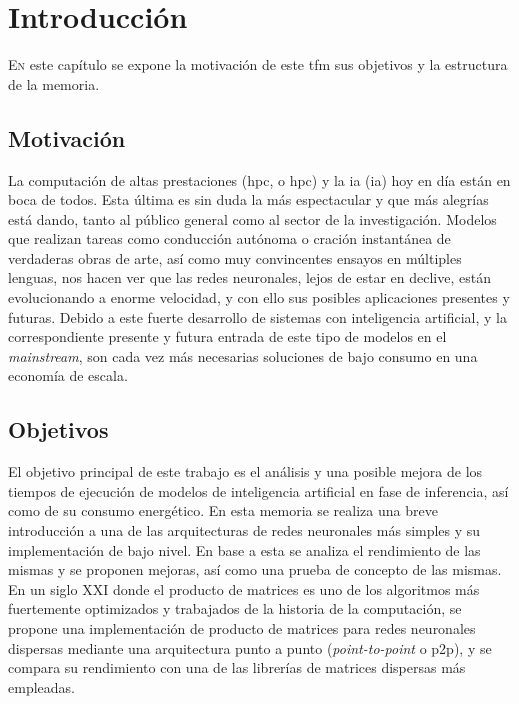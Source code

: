 \chapter{Introducción}
\label{chap:introducion}

\lettrine{E}{n} este capítulo se expone la motivación de este \acrlong{tfm} sus objetivos y la estructura de la memoria.

\section{Motivación}
\label{sec:motivacion}
La computación de altas prestaciones (\acrshort{hpc}, o \acrlong{hpc}) y la \acrlong{ia} (\acrshort{ia}) hoy en día están en boca de todos. Esta última es sin duda la más espectacular y que más alegrías está dando, tanto al público general como al sector de la investigación.
Modelos que realizan tareas como conducción autónoma o cración instantánea de verdaderas obras de arte, así como muy convincentes ensayos en múltiples lenguas, nos hacen ver que las redes neuronales, lejos de estar en declive, están evolucionando a enorme velocidad, y con ello sus posibles aplicaciones presentes y futuras. Debido a este fuerte desarrollo de sistemas con inteligencia artificial, y la correspondiente presente y futura entrada de este tipo de modelos en el \textit{mainstream}, son cada vez más necesarias soluciones de bajo consumo en una economía de escala.

\section{Objetivos}
\label{sec:objetivos}
El objetivo principal de este trabajo es el análisis y una posible mejora de los tiempos de ejecución de modelos de inteligencia artificial en fase de inferencia, así como de su consumo energético. En esta memoria se realiza una breve introducción a una de las arquitecturas de redes neuronales más simples y su implementación de bajo nivel. En base a esta se analiza el rendimiento de las mismas y se proponen mejoras, así como una prueba de concepto de las mismas. En un siglo XXI donde el producto de matrices es uno de los algoritmos más fuertemente optimizados y trabajados de la historia de la computación, se propone una implementación de producto de matrices para redes neuronales dispersas mediante una arquitectura punto a punto (\textit{point-to-point} o p2p), y se compara su rendimiento con una de las librerías de matrices dispersas más empleadas.

